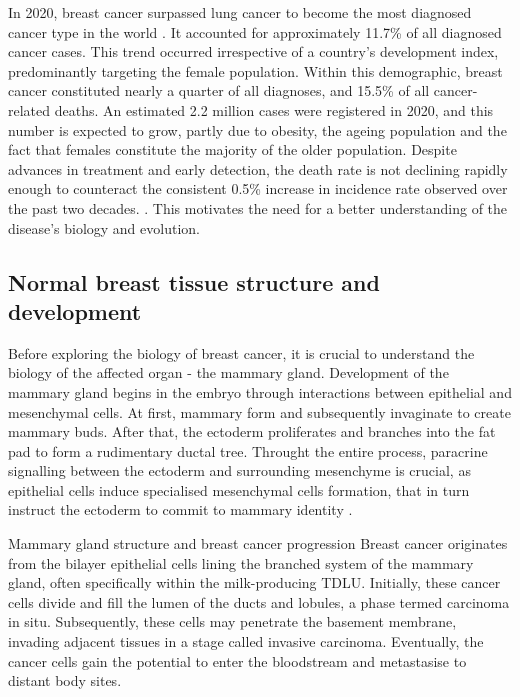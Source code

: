
In 2020, breast cancer surpassed lung cancer to become the most diagnosed cancer type in the world \parencite{Sung2021-xv}. It accounted for approximately 11.7\% of all diagnosed cancer cases. This trend occurred irrespective of a country's development index, predominantly targeting the female population. Within this demographic, breast cancer constituted nearly a quarter of all diagnoses, and 15.5\% of all cancer-related deaths. An estimated 2.2 million cases were registered in 2020, and this number is expected to grow, partly due to obesity, the ageing population and the fact that females constitute the majority of the older population. Despite advances in treatment and early detection, the death rate is not declining rapidly enough to counteract the consistent 0.5\% increase in incidence rate observed over the past two decades. \parencite{Cronin2022-mc}. This motivates the need for a better understanding of the disease's biology and evolution.

\subsection{Normal breast tissue structure and development}
\label{sec:applications-normal-breast-development}
Before exploring the biology of breast cancer, it is crucial to understand the biology of the affected organ - the mammary gland. Development of the mammary gland begins in the embryo through interactions between epithelial and mesenchymal cells. At first, mammary  form and subsequently invaginate to create mammary buds. After that, the ectoderm proliferates and branches into the fat pad to form a rudimentary ductal tree. Throught the entire process, paracrine signalling between the ectoderm and surrounding mesenchyme is crucial, as epithelial cells induce specialised mesenchymal cells formation, that in turn instruct the ectoderm to commit to mammary identity \parencite{Macias2012-su,Spina2021-ej}.

    {Mammary gland structure and breast cancer progression}
    {Breast cancer originates from the bilayer epithelial cells lining the branched system of the mammary gland, often specifically within the milk-producing \acf{TDLU}. Initially, these cancer cells divide and fill the lumen of the ducts and lobules, a phase termed carcinoma in situ. Subsequently, these cells may penetrate the basement membrane, invading adjacent tissues in a stage called invasive carcinoma. Eventually, the cancer cells gain the potential to enter the bloodstream and metastasise to distant body sites.}

